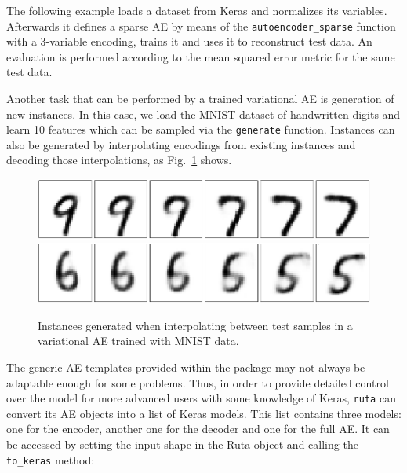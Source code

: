 

The following example loads a dataset from Keras and normalizes its variables. Afterwards it defines a sparse AE by means of the \texttt{autoencoder\_sparse} function with a 3-variable encoding, trains it and uses it to reconstruct test data. An evaluation is performed according to the mean squared error metric for the same test data.



Another task that can be performed by a trained variational AE is generation of new instances. In this case, we load the MNIST dataset of handwritten digits and learn 10 features which can be sampled via the \texttt{generate} function. Instances can also be generated by interpolating encodings from existing instances and decoding those interpolations, as Fig.~\ref{p2fig.variational} shows.




\begin{figure}[ht]
  \centering
  \includegraphics[width=0.8\columnwidth]{variational_97.pdf}
  \includegraphics[width=0.8\columnwidth]{variational_65.pdf}
  \caption{Instances generated when interpolating between test samples in a variational AE trained with MNIST data.}
  \label{p2fig.variational}
\end{figure}

{The generic AE templates provided within the package may not always be adaptable enough for some problems. Thus, in order to provide detailed control over the model for more advanced users with some knowledge of Keras, \texttt{ruta} can convert its AE objects into a list of Keras models. This list contains three models: one for the encoder, another one for the decoder and one for the full AE. It can be accessed by setting the input shape in the Ruta object and calling the \texttt{to\_keras} method:}

